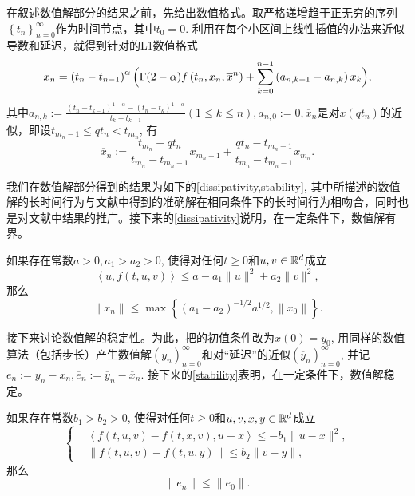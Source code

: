 在叙述数值解部分的结果之前，先给出数值格式。取严格递增趋于正无穷的序列$\left\{t_n\right\}_{n=0}^\infty$作为时间节点，其中$t_0=0$. 利用在每个小区间上线性插值的办法来近似导数和延迟，就得到针对\mainEquation 的L1数值格式
\begin{equation}\label{L1格式}
    x_n=\left(t_n-t_{n-1}\right)^\alpha \Bigl(\Gamma(2-\alpha) f\left(t_n,x_n,\overline{x}^n\right) + \sum_{k=0}^{n-1} \left(a_{n,k+1}-a_{n,k}\right) x_k\Bigr),
\end{equation}
其中$a_{n,k}:=\frac{\left(t_n-t_{k-1}\right)^{1-\alpha}-\left(t_n-t_{k}\right)^{1-\alpha}}{t_k-t_{k-1}} (1\leqslant k\leqslant n),a_{n,0}:=0,\overline x_n$是对$x(qt_n)$的近似，即设$t_{m_n-1}\leqslant qt_n<t_{m_n}$, 有
\begin{equation*}
    \overline x_n:=\frac{t_{m_n}-qt_n}{t_{m_n}-t_{m_n-1}}x_{m_n-1}+\frac{qt_n-t_{m_n-1}}{t_{m_n}-t_{m_n-1}}x_{m_n}.
\end{equation*}

我们在数值解部分得到的结果为如下的\cref{dissipativity,stability}, 其中所描述的数值解的长时间行为与文献中得到的准确解在相同条件下的长时间行为相吻合，同时也是对文献中结果的推广。接下来的\cref{dissipativity}说明，在一定条件下，数值解有界。
\begin{theorem}\label{dissipativity}
    如果存在常数$a>0,a_1>a_2>0$, 使得对任何$t\geqslant 0$和$u,v\in \mathbb{R}^d$成立
    \begin{equation*}
        \left<u,f(t,u,v)\right>\leqslant a-a_1 \|u\|^2+a_2 \|v\|^2,
    \end{equation*}
    那么
    \begin{equation}\label{耗散性结果}
        \|x_n\|\leqslant \max\left\{\left(a_1-a_2\right)^{-1/2}a^{1/2},\|x_0\|\right\}.
    \end{equation}
\end{theorem}
接下来讨论数值解的稳定性。为此，把\mainEquation 的初值条件改为$x(0)=y_0$, 用同样的数值算法（包括步长）产生数值解$\left(y_n\right)_{n=0}^\infty$和对“延迟”的近似$\left(\overline y_n\right)_{n=0}^\infty$, 并记$e_n:=y_n-x_n, \overline e_n:=\overline y_n-\overline x_n$. 接下来的\cref{stability}表明，在一定条件下，数值解稳定。
\begin{theorem}\label{stability}
    如果存在常数$b_1>b_2>0$, 使得对任何$t\geqslant 0$和$u,v,x,y\in \mathbb{R}^d$成立
    \begin{equation*}
        \left\{
            \begin{aligned}
                &\left<f(t,u,v)-f(t,x,v),u-x\right>\leqslant -b_1 \|u-x\|^2,
                \\ &\|f(t,u,v)-f(t,u,y)\|\leqslant b_2 \|v-y\|,
            \end{aligned}
        \right.
    \end{equation*}
    那么
    \begin{equation*}
        \|e_n\|\leqslant \|e_0\|.
    \end{equation*}
\end{theorem}